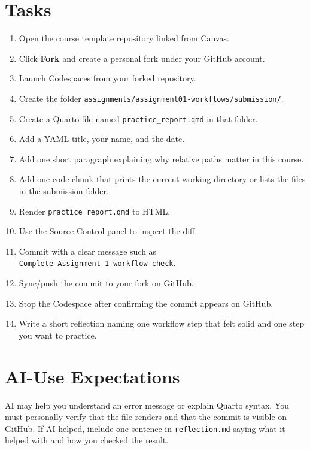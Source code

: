 \documentclass[
  letterpaper,
  DIV=11,
  numbers=noendperiod,
  oneside]{scrreprt}
\providecommand{\tightlist}{%
  \setlength{\itemsep}{0pt}\setlength{\parskip}{0pt}}
\begin{document}
\section{Tasks}\label{tasks}

\begin{enumerate}
\def\labelenumi{\arabic{enumi}.}
\tightlist
\item
  Open the course template repository linked from Canvas.
\item
  Click \textbf{Fork} and create a personal fork under your GitHub
  account.
\item
  Launch Codespaces from your forked repository.
\item
  Create the folder
  \texttt{assignments/assignment01-workflows/submission/}.
\item
  Create a Quarto file named \texttt{practice\_report.qmd} in that
  folder.
\item
  Add a YAML title, your name, and the date.
\item
  Add one short paragraph explaining why relative paths matter in this
  course.
\item
  Add one code chunk that prints the current working directory or lists
  the files in the submission folder.
\item
  Render \texttt{practice\_report.qmd} to HTML.
\item
  Use the Source Control panel to inspect the diff.
\item
  Commit with a clear message such as
  \texttt{Complete\ Assignment\ 1\ workflow\ check}.
\item
  Sync/push the commit to your fork on GitHub.
\item
  Stop the Codespace after confirming the commit appears on GitHub.
\item
  Write a short reflection naming one workflow step that felt solid and
  one step you want to practice.
\end{enumerate}

\section{AI-Use Expectations}\label{ai-use-expectations}

AI may help you understand an error message or explain Quarto syntax.
You must personally verify that the file renders and that the commit is
visible on GitHub. If AI helped, include one sentence in
\texttt{reflection.md} saying what it helped with and how you checked
the result.
\end{document}
